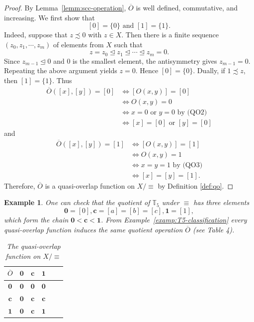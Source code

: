 \documentclass[preprint,12pt]{elsarticle}
\newtheorem{example}[theorem]{Example}
\begin{document}
\begin{proof}
By Lemma~\ref{lemm:scc-operation}, $\overline O$ is well defined, commutative, and increasing. We first show that
$$
 [0]=\{0\}\mbox{ and }[1]=\{1\}.
$$
Indeed, suppose that $z\precsim0$ with $z\in X$. Then there is a finite sequence $(z_0, z_1,\cdots, z_m)$ of elements from $X$ such that
$$
 z=z_0\trianglelefteq z_1\trianglelefteq\cdots\trianglelefteq z_m=0.
$$
Since $z_{m-1}\trianglelefteq0$ and $0$ is the smallest element, the antisymmetry gives $z_{m-1}=0$. Repeating the above argument yields $z=0$. Hence $[0]=\{0\}$. Dually, if $1\precsim z$, then $[1]=\{1\}$.
Thus $$
\begin{aligned}
\overline O([x],[y])=[0]
&\Longleftrightarrow [O(x,y)]=[0]\\
&\Longleftrightarrow O(x,y)=0\\
&\Longleftrightarrow x=0\mbox{ or }y=0 \mbox{ by (QO2)}\\
&\Longleftrightarrow [x]=[0]\mbox{ or }[y]=[0]
\end{aligned}
$$
and
$$
\begin{aligned}
\overline O([x],[y])=[1]
&\Longleftrightarrow [O(x,y)]=[1]\\
&\Longleftrightarrow O(x,y)=1\\
&\Longleftrightarrow x=y=1 \mbox{ by (QO3)}\\
&\Longleftrightarrow [x]=[y]=[1].
\end{aligned}
$$
Therefore, $\overline O$ is a quasi-overlap function on $X/{\equiv}$ by Definition \ref{def:qo}.
\end{proof}

\begin{example}\label{ex:T5-quotient}
\upshape
One can check that the quotient of $\mathbb{T}_5$ under $\equiv$ has three elements
$$
 \mathbf 0=[0], \mathbf c=[a]=[b]=[c], \mathbf 1=[1],
$$
which form the chain $\mathbf0<\mathbf c<\mathbf1$. From Example~\ref{examp:T5-classification} every quasi-overlap function induces the same quotient operation $\overline O$ (see Table 4).
\begin{table}[ht]
\centering
\caption{The quasi-overlap function on $X/{\equiv}$}
\label{tab:Oeta0}
\begin{tabular}{c|ccccc}
$\overline O$ & $\mathbf 0$ & $\mathbf c$ & $\mathbf 1$\\
\hline
$\mathbf 0$ & $\mathbf 0$ & $\mathbf 0$ & $\mathbf 0$\\
$\mathbf c$ & $\mathbf 0$ & $\mathbf c$ & $\mathbf c$\\
$\mathbf 1$ & $\mathbf 0$ & $\mathbf c$ & $\mathbf 1$\\
\end{tabular}
\end{table}
\end{example}
\end{document}
